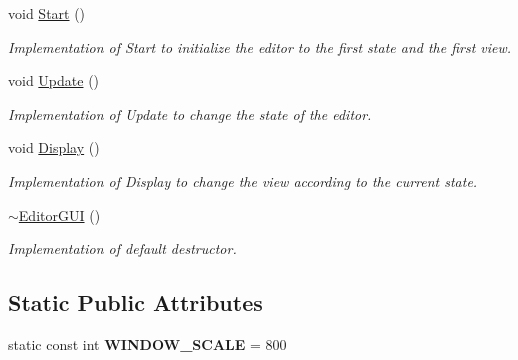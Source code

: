\begin{DoxyCompactItemize}
\hypertarget{class_editor_g_u_i_a1a7889ca377931974866645202059ed4}{}\label{class_editor_g_u_i_a1a7889ca377931974866645202059ed4} 
void \hyperlink{class_editor_g_u_i_a1a7889ca377931974866645202059ed4}{Start} ()
\begin{DoxyCompactList}\small\item\em Implementation of Start to initialize the editor to the first state and the first view. \end{DoxyCompactList}\item 
\hypertarget{class_editor_g_u_i_a23bbbfa7a03460a82f94204636928ea5}{}\label{class_editor_g_u_i_a23bbbfa7a03460a82f94204636928ea5} 
void \hyperlink{class_editor_g_u_i_a23bbbfa7a03460a82f94204636928ea5}{Update} ()
\begin{DoxyCompactList}\small\item\em Implementation of Update to change the state of the editor. \end{DoxyCompactList}\item 
\hypertarget{class_editor_g_u_i_ac24768dd57d990712ac59f77d6c65d65}{}\label{class_editor_g_u_i_ac24768dd57d990712ac59f77d6c65d65} 
void \hyperlink{class_editor_g_u_i_ac24768dd57d990712ac59f77d6c65d65}{Display} ()
\begin{DoxyCompactList}\small\item\em Implementation of Display to change the view according to the current state. \end{DoxyCompactList}\item 
\hypertarget{class_editor_g_u_i_a75a38ddb623e90b00d69eeacf04c71ce}{}\label{class_editor_g_u_i_a75a38ddb623e90b00d69eeacf04c71ce} 
\hyperlink{class_editor_g_u_i_a75a38ddb623e90b00d69eeacf04c71ce}{$\sim$\+Editor\+G\+UI} ()
\begin{DoxyCompactList}\small\item\em Implementation of default destructor. \end{DoxyCompactList}\end{DoxyCompactItemize}
\subsection*{Static Public Attributes}
\begin{DoxyCompactItemize}
\item 
\hypertarget{class_editor_g_u_i_a47758bdf3d67da6c4516bc5d6fd1bdec}{}\label{class_editor_g_u_i_a47758bdf3d67da6c4516bc5d6fd1bdec} 
static const int {\bfseries W\+I\+N\+D\+O\+W\+\_\+\+S\+C\+A\+LE} = 800
\end{DoxyCompactItemize}


